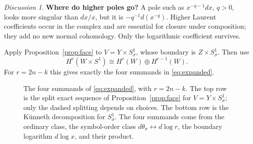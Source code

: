 \documentclass[11pt,oneside,reqno]{article}
\theoremstyle{plain}
\theoremstyle{definition}
\theoremstyle{remark}
\newtheorem*{discussion}{Discussion}
\begin{document}
\begin{discussion}
\textbf{Where do higher poles go?}
A pole such as \(x^{-q-1}dx\), \(q>0\), looks more singular than
\(dx/x\), but it is \(-q^{-1}d(x^{-q})\). Higher Laurent coefficients occur
in the complex and are essential for closure under composition; they add no
new normal cohomology. Only the logarithmic coefficient survives.
\end{discussion}

Apply Proposition~\ref{prop:face} to \(V=Y\times S^1_\sigma\), whose boundary
is \(Z\times S^1_\sigma\). Then use
\[
 H^r(W\times S^1)
 \cong H^r(W)\oplus H^{r-1}(W).
\]
For \(r=2n-k\) this gives exactly the four summands in
\eqref{eq:expanded}.

\begin{figure}[htbp]
\centering
{}
\caption[Interior, order, and boundary contributions]{The four summands of
\eqref{eq:expanded}, with \(r=2n-k\). The top row is the split exact
sequence of Proposition~\ref{prop:face} for \(V=Y\times S^1_\sigma\); only
the dashed splitting depends on choices. The bottom row is the K\"unneth
decomposition for \(S^1_\sigma\). The four summands come from the ordinary
class, the symbol-order class \(d\theta_\sigma\leftrightarrow d\log r\), the
boundary logarithm \(d\log x\), and their product.}
\end{figure}
\end{document}
